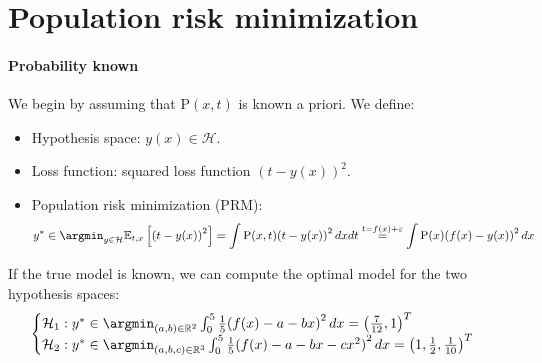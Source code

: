 \section{Population risk minimization}

\paragraph*{Probability known}
We begin by assuming that $\text{P}(x,t)$ is known a priori. 
We define:
\begin{itemize}
    \item Hypothesis space: $y(x) \in\mathcal{H}$. 
    \item Loss function: squared loss function ${(t-y(x))}^2$. 
    \item Population risk minimization (PRM):
        \[y^\ast\in\argmin_{y \in \mathcal{H}}\mathbb{E}_{t,x}\left[{(t-y(x))}^2\right]=\int\text{P}(x,t){(t-y(x))}^2\,dxdt\overset{t=f(x)+\varepsilon}{=}\int\text{P}(x){(f(x)-y(x))}^2\,dx\]
\end{itemize}

If the true model is known, we can compute the optimal model for the two hypothesis spaces:
\[\begin{cases}
    \mathcal{H}_1:y^\ast\in\argmin_{(a,b)\in\mathbb{R}^2}\int_0^5\frac{1}{5}{(f(x)-a-bx)}^2\,dx={\left(\frac{7}{12},1\right)}^T \\
    \mathcal{H}_2:y^\ast\in\argmin_{(a,b,c)\in\mathbb{R}^3}\int_0^5\frac{1}{5}{(f(x)-a-bx-cx^2)}^2\,dx={\left(1,\frac{1}{2},\frac{1}{10}\right)}^T
\end{cases}\]

